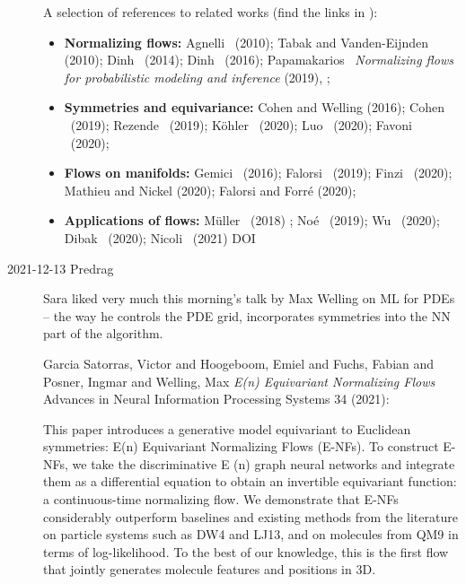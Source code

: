 \begin{description}
A selection of references to related works (find the links in
):
\begin{itemize}
\item
  \textbf{Normalizing flows:}
  Agnelli \etal~(2010); %
  Tabak and Vanden-Eijnden (2010); %
  Dinh \etal~(2014); %
  Dinh \etal~(2016); %
  Papamakarios \etal\
    {\em Normalizing flows for probabilistic modeling and inference} (2019),
    \arXiv{1912.02762};
\item
  \textbf{Symmetries and equivariance:}
  Cohen and Welling (2016); %
  Cohen \etal~(2019); %
  Rezende \etal~(2019); %
  K{\"o}hler \etal~(2020); %
  Luo \etal~(2020); %
  Favoni \etal~(2020); %
\item
  \textbf{Flows on manifolds:}
  Gemici \etal~(2016); %
  Falorsi \etal~(2019); %
  Finzi \etal~(2020); %
  Mathieu and Nickel (2020); %
  Falorsi and Forr{\'e} (2020); %
\item
  \textbf{Applications of flows:} M{\"u}ller \etal~(2018)
; %
  No{\'e} \etal~(2019); %
  Wu \etal~(2020); %
  Dibak \etal~(2020); %
  Nicoli \etal~(2021)  {DOI}
\end{itemize}

\item[2021-12-13 Predrag]
Sara liked very much this morning’s talk by
 {Max Welling} on ML for PDEs
– the way he controls the PDE grid, incorporates symmetries into the NN
part of the algorithm.

Garcia Satorras, Victor and Hoogeboom, Emiel and Fuchs, Fabian and
Posner, Ingmar and Welling, Max
{{\em E(n) Equivariant Normalizing Flows}}
Advances in Neural Information Processing Systems 34 (2021):

This paper introduces a generative model equivariant to Euclidean
symmetries: E(n) Equivariant Normalizing Flows (E-NFs). To construct
E-NFs, we take the discriminative E (n) graph neural networks and
integrate them as a differential equation to obtain an invertible
equivariant function: a continuous-time normalizing flow. We demonstrate
that E-NFs considerably outperform baselines and existing methods from
the literature on particle systems such as DW4 and LJ13, and on molecules
from QM9 in terms of log-likelihood. To the best of our knowledge, this
is the first flow that jointly generates molecule features and positions
in 3D.





\end{description}




